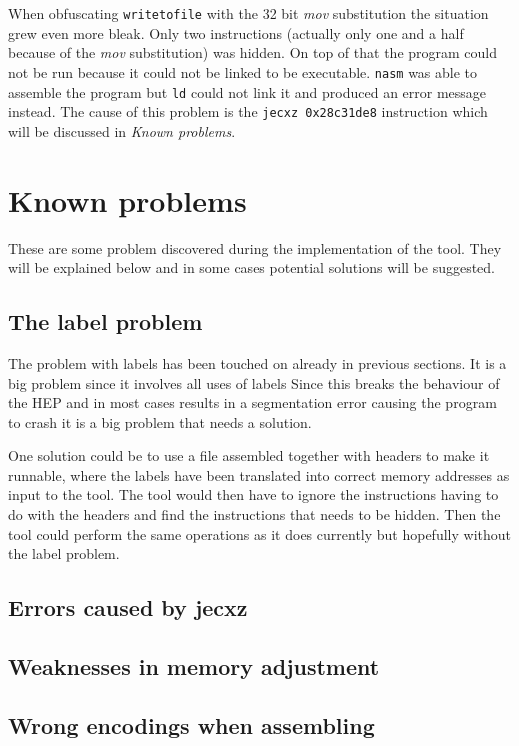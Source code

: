 \documentclass[11pt,twoside]{eitExjobb}
\begin{document}
When obfuscating \texttt{writetofile} with the 32 bit \emph{mov} substitution the situation grew even more bleak. Only two instructions (actually only one and a half because of the \emph{mov} substitution) was hidden. On top of that the program could not be run because it could not be linked to be executable. \texttt{nasm} was able to assemble the program but \texttt{ld}\cite{ld} could not link it and produced an error message instead. The cause of this problem is the \texttt{jecxz 0x28c31de8} instruction which will be discussed in \emph{Known problems}.

\section{Known problems}
These are some problem discovered during the implementation of the tool. They will be explained below and in some cases potential solutions will be suggested.

\subsection{The label problem}
The problem with labels has been touched on already in previous sections. It is a big problem since it involves all uses of labels Since this breaks the behaviour of the HEP and in most cases results in a segmentation error causing the program to crash it is a big problem that needs a solution. 

One solution could be to use a file assembled together with headers to make it runnable, where the labels have been translated into correct memory addresses as input to the tool. The tool would then have to ignore the instructions having to do with the headers and find the instructions that needs to be hidden. Then the tool could perform the same operations as it does currently but hopefully without the label problem. 

\subsection{Errors caused by jecxz}


\subsection{Weaknesses in memory adjustment}


\subsection{Wrong encodings when assembling}
\end{document}
